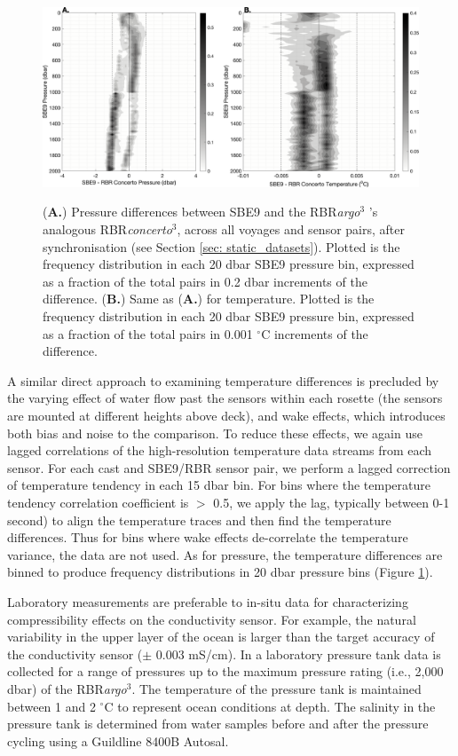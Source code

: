 \documentclass{ametsocV6.1}
\begin{document}
\begin{figure}[t]
	\includegraphics[width = \linewidth]{Fig3_PT_accuracy.png}\\
	\caption{(\textbf{A.}) Pressure differences between SBE9 and the RBR\textit{argo}$^3$ 's analogous RBR\textit{concerto}$^3$, across all voyages and sensor pairs, after synchronisation (see Section \ref{sec: static_datasets}).  Plotted is the frequency distribution in each 20 dbar SBE9 pressure bin, expressed as a fraction of the total pairs in 0.2 dbar increments of the difference.  (\textbf{B.}) Same as (\textbf{A.}) for temperature. Plotted is the frequency distribution in each 20 dbar SBE9 pressure bin, expressed as a fraction of the total pairs in 0.001 $^\circ$C increments of the difference. }
	\label{fig: PT_accuracy}
\end{figure}

A similar direct approach to examining temperature differences is precluded by the varying effect of water flow past the sensors within each rosette (the sensors are mounted at different heights above deck), and wake effects, which introduces both bias and noise to the comparison. 
To reduce these effects, we again use lagged correlations of the high-resolution temperature data streams from each sensor. 
For each cast and SBE9/RBR sensor pair, we perform a lagged correction of temperature tendency in each 15 dbar bin. 
For bins where the temperature tendency correlation coefficient is $>$ 0.5, we apply the lag, typically between 0-1 second) to align the temperature traces and then find the temperature differences. 
Thus for bins where wake effects de-correlate the temperature variance, the data are not used.  
As for pressure, the temperature differences are binned to produce frequency distributions in 20 dbar pressure bins (Figure \ref{fig: PT_accuracy}). 

Laboratory measurements are preferable to in-situ data for characterizing compressibility effects on the conductivity sensor.
For example, the natural variability in the upper layer of the ocean is larger than the target accuracy of the conductivity sensor ($\pm$ 0.003 mS/cm).
In a laboratory pressure tank data is collected for a range of pressures up to the maximum pressure rating (i.e., 2,000 dbar) of the RBR\textit{argo}$^3$.
The temperature of the pressure tank is maintained between 1 and 2 $^\circ$C to represent ocean conditions at depth. 
The salinity in the pressure tank is determined from water samples before and after the pressure cycling using a Guildline 8400B Autosal.
\end{document}
